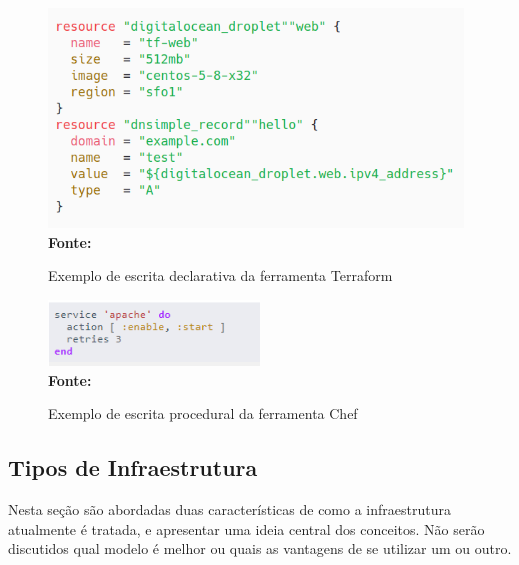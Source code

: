  \begin{figure}[ht]
	\centering	
	\caption[\hspace{0.1cm}Exemplo declarativo]{Exemplo de escrita declarativa da ferramenta Terraform}
	\vspace{-0.4cm}
	\includegraphics[width=0.98\textwidth]{artigo/figuras/terraform-declarative-exemple-01.png}
	 \vspace{-0.2cm}
	\\\textbf{\footnotesize Fonte: \cite{terraform01} }
	\label{fig:figura4}
\end{figure}
\vspace{-0.5cm}
 
\begin{figure}[h]
	\centering	
	\caption[\hspace{0.1cm}Exemplo procedural]{Exemplo de escrita procedural da ferramenta Chef}
	\vspace{-0.4cm}
	\includegraphics[width=0.5\textwidth]{figuras/chef-io-exemplo-procedural.png}
	 \vspace{-0.2cm}
	\\\textbf{\footnotesize Fonte: \cite{chef01}}
	\label{fig:figura5}
\end{figure}
\vspace{-0.5cm}

 \subsection{Tipos de Infraestrutura}
 
Nesta seção são abordadas duas características de como a infraestrutura atualmente é tratada, e apresentar uma ideia central dos conceitos. Não serão discutidos qual modelo é melhor ou quais as vantagens de se utilizar um ou outro.

